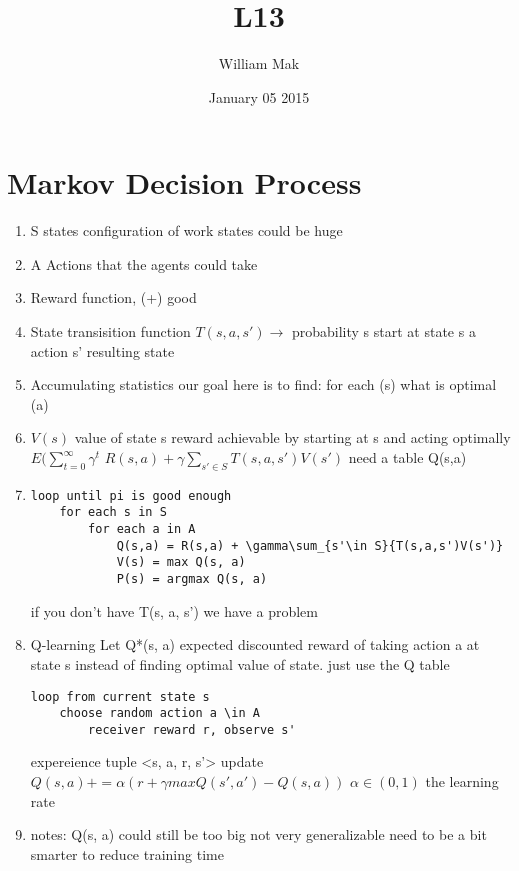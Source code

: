 \documentclass{article}
\title{L13}
\author{William Mak}
\date{January 05 2015}
\begin{document}
\maketitle
\section{Markov Decision Process}
\begin{enumerate}
	\item S \- states configuration of work
		\subitem states could be huge
	\item A \- Actions that the agents could take
	\item Reward function, (+) \- good
	\item State transisition function
		\subitem $T(s, a, s') \to$ probability
		\subitem s \- start at state s
		\subitem a \- action
		\subitem s' \- resulting state
	\item Accumulating statistics
		\subitem our goal here is to find:
		\subitem for each (s) what is optimal (a)
	\item $V(s)$ value of state s
		\subitem reward achievable by starting at s and acting optimally
		\subitem $E(\sum_{t=0}^{\infty}{\gamma^t}$
		\subitem $R(s,a) + \gamma\sum_{s'\in S}{T(s,a,s')V(s')}$
		\subitem need a table Q(s,a)
	\item
\begin{lstlisting}
loop until pi is good enough
	for each s in S
		for each a in A
			Q(s,a) = R(s,a) + \gamma\sum_{s'\in S}{T(s,a,s')V(s')}
			V(s) = max Q(s, a)
			P(s) = argmax Q(s, a)
\end{lstlisting}
		\subitem if you don't have T(s, a, s') we have a problem
	\item Q-learning
		\subitem  Let Q*(s, a) \- expected discounted reward of taking action a
		at state s
		\subitem instead of finding optimal value of state. just use the Q table
		\subitem
\begin{lstlisting}
loop from current state s
	choose random action a \in A
		receiver reward r, observe s'
\end{lstlisting}
		\subitem expereience tuple <s, a, r, s'>
		\subitem update $Q(s,a) += \alpha(r + \gamma maxQ(s', a') - Q(s, a))$
		\subitem $\alpha \in (0,1)$ the learning rate
	\item notes:
		\subitem Q(s, a) could still be too big
		\subitem not very generalizable
		\subitem need to be a bit smarter to reduce training time
\end{enumerate}
\end{document}
